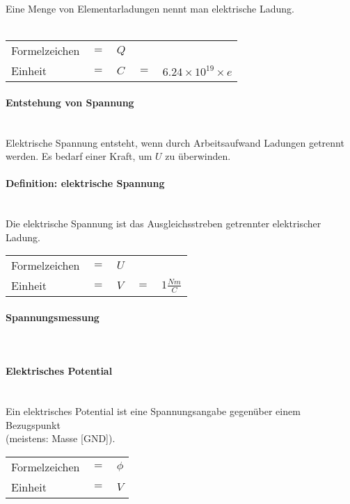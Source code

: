 \noindent Eine Menge von Elementarladungen nennt man elektrische Ladung.\\\\
\begin{tabular}{lllll}
Formelzeichen	& $=$ & $Q$ & & \\
Einheit			& $=$ & $C$ & $=$ & $6.24 \times 10^{19} \times e$
\end{tabular}	
		
		\paragraph{Entstehung von Spannung}~\\
		
\noindent Elektrische Spannung entsteht, wenn durch Arbeitsaufwand Ladungen getrennt werden. Es bedarf einer Kraft, um $U$ zu überwinden.
		
		\paragraph{Definition: elektrische Spannung}~\\

\noindent Die elektrische Spannung ist das Ausgleichsstreben getrennter elektrischer Ladung.

\begin{tabular}{lllll}
Formelzeichen	& $=$ & $U$ & & \\
Einheit			& $=$ & $V$ & $=$ & $1\frac{Nm}{C}$ \\
\end{tabular}	
		
		\paragraph{Spannungsmessung}~\\
		\paragraph{Elektrisches Potential}~\\
		
\noindent Ein elektrisches Potential ist eine Spannungsangabe gegenüber einem Bezugspunkt\\(meistens: Masse [GND]).

\begin{tabular}{lll}
Formelzeichen	& $=$ & $\phi$ \\
Einheit			& $=$ & $V$ \\
\end{tabular}	
		
